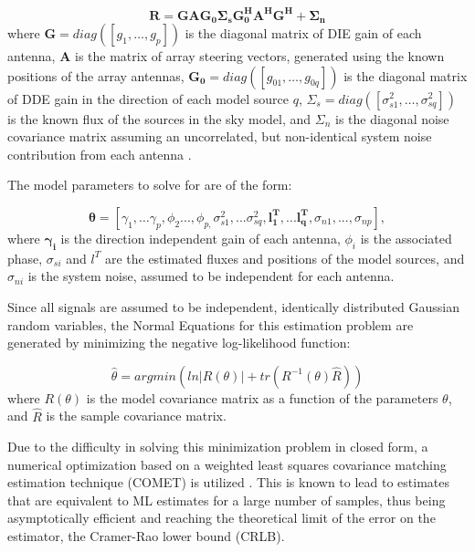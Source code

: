 \documentclass{aa}
\begin{document}
\begin{equation}
\mathbf{R=GAG_{0}\Sigma_{s}G_{0}^{H}A^{H}G^{H}+\Sigma_{n}}\label{eq:datamodel}
\end{equation}
where \textbf{$\mathbf{G=}diag(\left[g_{1},\ldots,g_{p}\right])$
}is the diagonal matrix of DIE gain of each antenna, $\mathbf{A}$
is the matrix of array steering vectors, generated using the known
positions of the array antennas, $\mathbf{G_{0}=}diag(\left[g_{01},\ldots,g_{0q}\right])$
is the diagonal matrix of DDE gain in the direction of each model
source $q$, $\Sigma_{s}=diag\left(\left[\sigma_{s1}^{2},\ldots,\sigma_{sq}^{2}\right]\right)$
is the known flux of the sources in the sky model, and $\Sigma_{n}$
is the diagonal noise covariance matrix assuming an uncorrelated,
but non-identical system noise contribution from each antenna .

The model parameters to solve for are of the form:

\begin{equation}
\mathbf{\theta}=[\gamma_{1},\ldots\gamma_{p},\phi_{2}...,\phi_{p,}\sigma_{s1}^{2},...\sigma_{sq}^{2},\mathbf{l_{1}^{T}},...\mathbf{l_{q}^{T}},\sigma_{n1},...,\sigma_{np}],\label{eq:estparam}
\end{equation}
 where $\mathbf{\gamma_{i}}$ is the direction independent gain of
each antenna, $\phi_{i}$ is the associated phase, $\sigma_{si}$
and $l^{T}$ are the estimated fluxes and positions of the model sources,
and $\sigma_{ni}$ is the system noise, assumed to be independent
for each antenna.

Since all signals are assumed to be independent, identically distributed
Gaussian random variables, the Normal Equations for this estimation
problem are generated by minimizing the negative log-likelihood function:

\begin{equation}
\hat{\theta}=argmin\left(ln|R(\theta)|+tr(R^{-1}(\theta)\widehat{R})\right)\label{eq:normeq}
\end{equation}
 where $R(\theta)$ is the model covariance matrix as a function of
the parameters $\theta$, and $\widehat{R}$ is the sample covariance
matrix.

Due to the difficulty in solving this minimization problem in closed
form, a numerical optimization based on a weighted least squares covariance
matching estimation technique (COMET) is utilized \citep{ottersten1998covariance}.
This is known to lead to estimates that are equivalent to ML estimates
for a large number of samples, thus being asymptotically efficient
and reaching the theoretical limit of the error on the estimator,
the Cramer-Rao lower bound (CRLB).
\end{document}
